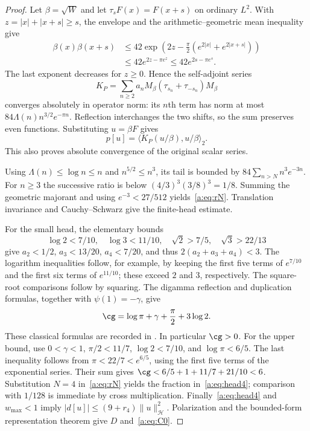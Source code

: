 \documentclass[11pt,a4paper]{article}
\numberwithin{equation}{section}
\theoremstyle{definition}\newtheorem{definition}[theorem]{Definition}
\theoremstyle{remark}\newtheorem{remark}[theorem]{Remark}
\newcommand{\Hh}{\mathcal H}\newcommand{\Hw}{\mathcal H}
\newcommand{\ip}[2]{\langle#1,#2\rangle}\newcommand{\norm}[1]{\lVert#1\rVert}\newcommand{\abs}[1]{\lvert#1\rvert}
\begin{document}
\begin{proof}
Let $\beta=\sqrt W$ and let $\tau_sF(x)=F(x+s)$ on ordinary $L^2$. With $z=|x|+|x+s|\ge s$, the envelope and the arithmetic--geometric mean inequality give
\begin{align*}
 \beta(x)\beta(x+s)
 &\le42\exp\left(2z-\frac\pi2(e^{2|x|}+e^{2|x+s|})\right)\\
 &\le42e^{2z-\pi e^z}\le42e^{2s-\pi e^s}.
\end{align*}
The last exponent decreases for $z\ge0$. Hence the self-adjoint series
\begin{equation}\label{a:eq:KP}
 K_P=\sum_{n\ge2}a_nM_\beta(\tau_{s_n}+\tau_{-s_n})M_\beta
\end{equation}
converges absolutely in operator norm: its $n$th term has norm at most
$84\Lambda(n)n^{3/2}e^{-\pi n}$.
Reflection interchanges the two shifts, so the sum preserves even functions. Substituting $u=\beta F$ gives
\begin{equation}\label{a:eq:prepresentation}
 p[u]=\ip{K_P(u/\beta)}{u/\beta}_2.
\end{equation}
This also proves absolute convergence of the original scalar series.

Using $\Lambda(n)\le\log n\le n$ and $n^{5/2}\le n^3$, its tail is bounded by
$84\sum_{n>N}n^3e^{-3n}$. For $n\ge3$ the successive ratio is below
$(4/3)^3(3/8)^3=1/8$. Summing the geometric majorant and using
$e^{-3}<27/512$ yields~\eqref{a:eq:rN}. Translation invariance and Cauchy--Schwarz give the finite-head estimate.

For the small head, the elementary bounds
\[
 \log2<7/10,\quad \log3<11/10,\quad
 \sqrt2>7/5,\quad \sqrt3>22/13
\]
give $a_2<1/2$, $a_3<13/20$, $a_4<7/20$, and thus
$2(a_2+a_3+a_4)<3$. The logarithm inequalities follow, for example, by keeping the first five terms of $e^{7/10}$ and the first six terms of $e^{11/10}$; these exceed $2$ and $3$, respectively. The square-root comparisons follow by squaring.
The digamma reflection and duplication formulas, together with $\psi(1)=-\gamma$, give
\[
 \cg=\log\pi+\gamma+\frac\pi2+3\log2.
\]
These classical formulas are recorded in \cite[Sections 5.4--5.5]{DLMF}. In particular $\cg>0$. For the upper bound, use $0<\gamma<1$, $\pi/2<11/7$, $\log2<7/10$, and $\log\pi<6/5$. The last inequality follows from $\pi<22/7<e^{6/5}$, using the first five terms of the exponential series. Their sum gives
$\cg<6/5+1+11/7+21/10<6$.
Substitution $N=4$ in~\eqref{a:eq:rN} yields the fraction in~\eqref{a:eq:head4}; comparison with $1/128$ is immediate by cross multiplication.
Finally~\eqref{a:eq:head4} and $w_{\max}<1$ imply
$|d[u]|\le(9+r_4)\norm u_{\Hh}^2$. Polarization and the bounded-form representation theorem give $D$ and~\eqref{a:eq:C0}.
\end{proof}
\end{document}
